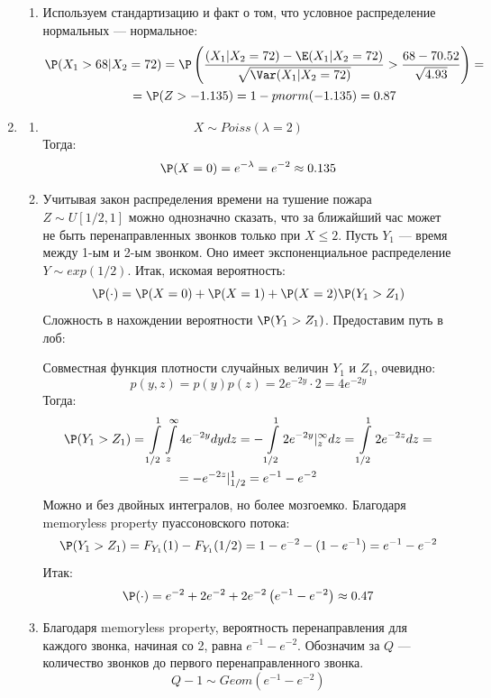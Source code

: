 \begin{enumerate}
\begin{enumerate}
\item Используем стандартизацию и факт о том, что условное распределение нормальных — нормальное:
\begin{multline*}
\P (X_1 > 68 | X_2 = 72)  = \P \left(\frac{(X_1 | X_2 = 72) - \E (X_1 | X_2 = 72)}{\sqrt{\Var (X_1 | X_2 = 72)}} > \frac{68 - 70.52}{\sqrt{4.93}} \right) = \\
= \P (Z> -1.135 ) = 1 - pnorm(-1.135) =0.87
\end{multline*}
\end{enumerate}

\item
\begin{enumerate}
\item \[X \sim Poiss(\lambda = 2 )\]
Тогда: \[\P (X = 0) = e^{-\lambda}= e^{-2}\approx 0.135  \]
\item Учитывая закон распределения времени на тушение пожара $Z \sim U[1/2,1]$ можно однозначно сказать, что за ближайший час может не быть перенаправленных звонков только при $X\leqslant 2$. Пусть $Y_1$ — время между 1-ым и 2-ым звонком. Оно имеет экспоненциальное распределение $Y \sim exp(1/2)$. Итак, искомая вероятность:
\[ \P (\cdot) = \P(X=0) + \P(X=1) + \P(X=2) \P(Y_1 > Z_1) \]
Сложность в нахождении вероятности $\P(Y_1 > Z_1)$. Предоставим путь в лоб:

Совместная функция плотности случайных величин $Y_1$ и $Z_1$, очевидно:
\[ p(y,z) = p(y) p(z) = 2e^{-2y} \cdot 2 = 4e^{-2y} \]
Тогда:
\begin{multline*}
\P(Y_1 > Z_1) = \int \limits_{1/2}^1 \int \limits_z^\infty 4e^{-2y}  dy dz = -\int \limits_{1/2}^1 2e^{-2y} |_z^\infty dz = \int \limits_{1/2}^1 2e^{-2z} dz= \\
= -e^{-2z} |_{1/2}^1 =e^{-1} - e^{-2}
\end{multline*}
Можно и без двойных интегралов, но более мозгоемко. Благодаря memoryless property пуассоновского потока:
\[\P(Y_1 > Z_1) = F_{Y_1} (1) - F_{Y_1} (1/2) = 1 - e^{-2} - (1 - e^{-1}) = e^{-1} - e^{-2} \]
Итак:
\[ \P (\cdot) = e^{-2} + 2 e^{-2} + 2 e^{-2} \left( e^{-1} - e^{-2} \right) \approx 0.47 \]

\item Благодаря memoryless property, вероятность перенаправления для каждого звонка, начиная со 2, равна $e^{-1} - e^{-2}$. Обозначим за $Q$ — количество звонков до первого перенаправленного звонка. \[Q - 1 \sim Geom (e^{-1} - e^{-2}) \]
\end{enumerate}




\end{enumerate}

